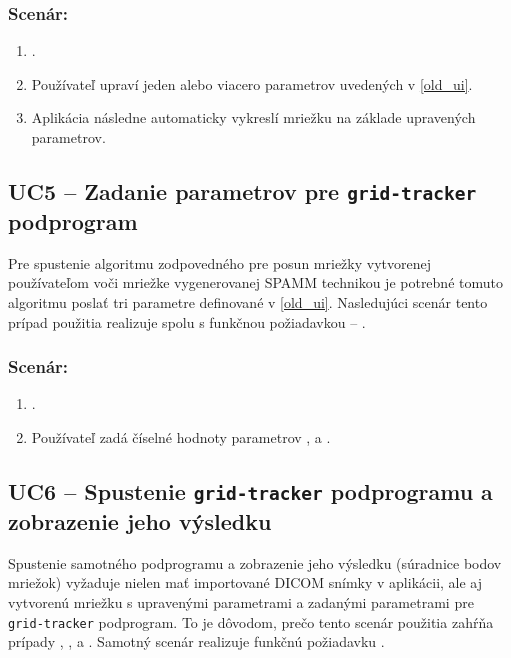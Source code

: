 \subsubsection*{Scenár:}
\begin {enumerate}
\item {.}
\item {Používateľ upraví jeden alebo viacero parametrov uvedených v \ref{old_ui}.}
\item {Aplikácia následne automaticky vykreslí mriežku na základe upravených parametrov.}
\end {enumerate}

\subsection {UC5 -- Zadanie parametrov pre \texttt{grid-tracker} podprogram}\label{uc5}
Pre spustenie algoritmu zodpovedného pre posun mriežky vytvorenej používateľom voči mriežke vygenerovanej SPAMM technikou je potrebné tomuto algoritmu poslať tri parametre definované v \ref{old_ui}. Nasledujúci scenár tento prípad použitia realizuje spolu s funkčnou požiadavkou -- .

\subsubsection*{Scenár:}
\begin {enumerate}
\item {.}
\item {Používateľ zadá číselné hodnoty parametrov , \newline {} a .}
\end {enumerate}

\subsection {UC6 -- Spustenie \texttt{grid-tracker} podprogramu a zobrazenie jeho výsledku}
Spustenie samotného podprogramu a zobrazenie jeho výsledku (súradnice bodov mriežok) vyžaduje nielen mať importované DICOM snímky v aplikácii, ale aj vytvorenú mriežku s upravenými parametrami a zadanými parametrami pre \texttt{grid-tracker} podprogram. To je dôvodom, prečo tento scenár použitia zahŕňa prípady , ,  a . Samotný scenár realizuje funkčnú požiadavku .

